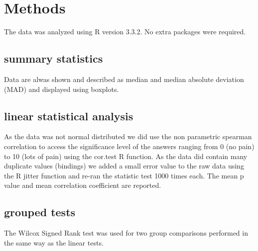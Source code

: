 \section{Methods}

The data was analyzed using R version 3.3.2. No extra packages were required.

\subsection{summary statistics}

Data are alwas shown and described as median and median absolute deviation
(MAD) and displayed using boxplots.

\subsection{linear statistical analysis}

As the data was not normal distributed we did use the non parametric spearman
correlation to access the significance level of the answers ranging from 0 (no
pain) to 10 (lots of pain) using the cor.test R function. As the data did
contain many duplicate values (bindings) we added a small error value to the raw data using the R jitter
function and re-ran the statistic test 1000 times each. The
mean p value and mean correlation coefficient are reported.

\subsection{grouped tests}

The Wilcox Signed Rank test was used for two group comparisons performed in the
same way as the linear tests.
